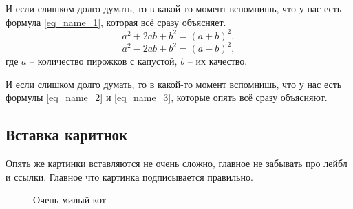 \documentclass[a4paper, 12pt]{article}
\begin{document}
И если слишком долго думать, то в какой-то момент вспомнишь, что у нас есть формула \ref{eq_name_1}, которая всё сразу объясняет.
\begin{equation}
    a^2 + 2ab + b ^2 = (a + b)^2,
    \label{eq_name_2}
\end{equation}
\begin{equation}
    a^2 - 2ab + b^2 = (a - b)^2,
    \label{eq_name_3}
\end{equation}
где $a$ -- количество пирожков с капустой, $b$ -- их качество.

И если слишком долго думать, то в какой-то момент вспомнишь, что у нас есть формулы \ref{eq_name_2} и \ref{eq_name_3}, которые опять всё сразу объясняют.

\subsection{Вставка каритнок}
Опять же картинки вставляются не очень сложно, главное не забывать про лейбл и ссылки. Главное что картинка подписывается правильно.
\begin{figure}[h]
    \caption{\label{img_cat}Очень милый кот}
\end{figure}
\end{document}
